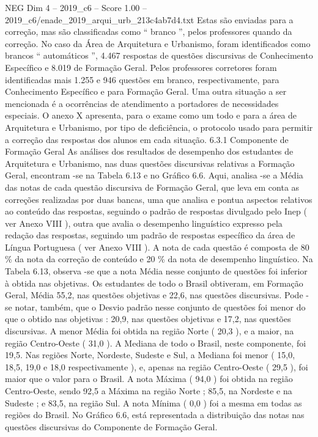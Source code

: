 \begin{textsample}{NEG Dim 4 – 2019\_c6 – Score 1.00 – 2019\_c6/enade\_2019\_arqui\_urb\_213c4ab7d4.txt}
Estas são enviadas para a correção, mas são classificadas como “ branco ”, pelos professores quando da correção.
No caso da Área de Arquitetura e Urbanismo, foram identificados como brancos “ automáticos ”, 4.467 respostas de questões discursivas de Conhecimento Específico e 8.019 de Formação Geral.
Pelos professores corretores foram identificadas mais 1.255 e 946 questões em branco, respectivamente, para Conhecimento Específico e para Formação Geral.
Uma outra situação a ser mencionada é a ocorrências de atendimento a portadores de necessidades especiais.
O anexo X apresenta, para o exame como um todo e para a área de Arquitetura e Urbanismo, por tipo de deficiência, o protocolo usado para permitir a correção das respostas dos alunos em cada situação. 6.3.1 Componente de Formação Geral As análises dos resultados de desempenho dos estudantes de Arquitetura e Urbanismo, nas duas questões discursivas relativas a Formação Geral, encontram -se na Tabela 6.13 e no Gráfico 6.6.
Aqui, analisa -se a Média das notas de cada questão discursiva de Formação Geral, que leva em conta as correções realizadas por duas bancas, uma que analisa e pontua aspectos relativos ao conteúdo das respostas, seguindo o padrão de respostas divulgado pelo Inep ( ver Anexo VIII ), outra que avalia o desempenho linguístico expresso pela redação das respostas, seguindo um padrão de respostas específico da área de Língua Portuguesa ( ver Anexo VIII ).
A nota de cada questão é composta de 80 \% da nota da correção de conteúdo e 20 \% da nota de desempenho linguístico.
Na Tabela 6.13, observa -se que a nota Média nesse conjunto de questões foi inferior à obtida nas objetivas.
Os estudantes de todo o Brasil obtiveram, em Formação Geral, Média 55,2, nas questões objetivas e 22,6, nas questões discursivas.
Pode -se notar, também, que o Desvio padrão nesse conjunto de questões foi menor do que o obtido nas objetivas : 20,9, nas questões objetivas e 17,2, nas questões discursivas.
A menor Média foi obtida na região Norte ( 20,3 ), e a maior, na região Centro-Oeste ( 31,0 ).
A Mediana de todo o Brasil, neste componente, foi 19,5.
Nas regiões Norte, Nordeste, Sudeste e Sul, a Mediana foi menor ( 15,0, 18,5, 19,0 e 18,0 respectivamente ), e, apenas na região Centro-Oeste ( 29,5 ), foi maior que o valor para o Brasil.
A nota Máxima ( 94,0 ) foi obtida na região Centro-Oeste, sendo 92,5 a Máxima na região Norte ; 85,5, na Nordeste e na Sudeste ; e 83,5, na região Sul.
A nota Mínima ( 0,0 ) foi a mesma em todas as regiões do Brasil.
No Gráfico 6.6, está representada a distribuição das notas nas questões discursivas do Componente de Formação Geral.

\end{textsample}
